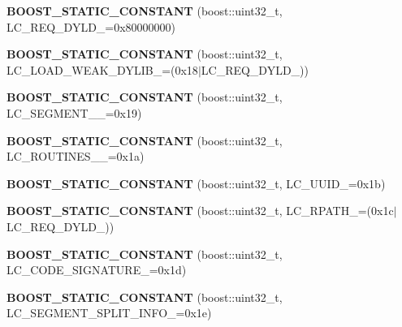 \begin{DoxyCompactItemize}
\mbox{\label{a01552_a38556d418f79efda908e855b2fada64e}} 
{\bfseries B\+O\+O\+S\+T\+\_\+\+S\+T\+A\+T\+I\+C\+\_\+\+C\+O\+N\+S\+T\+A\+NT} (boost\+::uint32\+\_\+t, L\+C\+\_\+\+R\+E\+Q\+\_\+\+D\+Y\+L\+D\+\_\+=0x80000000)
\item 
\mbox{\label{a01552_ac183a506054948c8bf2b0f62e5afbc2a}} 
{\bfseries B\+O\+O\+S\+T\+\_\+\+S\+T\+A\+T\+I\+C\+\_\+\+C\+O\+N\+S\+T\+A\+NT} (boost\+::uint32\+\_\+t, L\+C\+\_\+\+L\+O\+A\+D\+\_\+\+W\+E\+A\+K\+\_\+\+D\+Y\+L\+I\+B\+\_\+=(0x18$\vert$\+L\+C\+\_\+\+R\+E\+Q\+\_\+\+D\+Y\+L\+D\+\_\+))
\item 
\mbox{\label{a01552_a95224d2abc26fcd971f8abb80c68e822}} 
{\bfseries B\+O\+O\+S\+T\+\_\+\+S\+T\+A\+T\+I\+C\+\_\+\+C\+O\+N\+S\+T\+A\+NT} (boost\+::uint32\+\_\+t, L\+C\+\_\+\+S\+E\+G\+M\+E\+N\+T\+\_\+\_\+=0x19)
\item 
\mbox{\label{a01552_af3ee965b42b28daf4af3cf5d303fd465}} 
{\bfseries B\+O\+O\+S\+T\+\_\+\+S\+T\+A\+T\+I\+C\+\_\+\+C\+O\+N\+S\+T\+A\+NT} (boost\+::uint32\+\_\+t, L\+C\+\_\+\+R\+O\+U\+T\+I\+N\+E\+S\+\_\+\_\+=0x1a)
\item 
\mbox{\label{a01552_ab9a1ea56b4daa5742fb6ca86c0c1e0ba}} 
{\bfseries B\+O\+O\+S\+T\+\_\+\+S\+T\+A\+T\+I\+C\+\_\+\+C\+O\+N\+S\+T\+A\+NT} (boost\+::uint32\+\_\+t, L\+C\+\_\+\+U\+U\+I\+D\+\_\+=0x1b)
\item 
\mbox{\label{a01552_aa383ccae1c85ee5f2aed108bd84ba4d2}} 
{\bfseries B\+O\+O\+S\+T\+\_\+\+S\+T\+A\+T\+I\+C\+\_\+\+C\+O\+N\+S\+T\+A\+NT} (boost\+::uint32\+\_\+t, L\+C\+\_\+\+R\+P\+A\+T\+H\+\_\+=(0x1c$\vert$\+L\+C\+\_\+\+R\+E\+Q\+\_\+\+D\+Y\+L\+D\+\_\+))
\item 
\mbox{\label{a01552_af5641df120639f5faeeef336f8bb79be}} 
{\bfseries B\+O\+O\+S\+T\+\_\+\+S\+T\+A\+T\+I\+C\+\_\+\+C\+O\+N\+S\+T\+A\+NT} (boost\+::uint32\+\_\+t, L\+C\+\_\+\+C\+O\+D\+E\+\_\+\+S\+I\+G\+N\+A\+T\+U\+R\+E\+\_\+=0x1d)
\item 
\mbox{\label{a01552_a1d748241537cdf48cae6d7c2ad3dd46c}} 
{\bfseries B\+O\+O\+S\+T\+\_\+\+S\+T\+A\+T\+I\+C\+\_\+\+C\+O\+N\+S\+T\+A\+NT} (boost\+::uint32\+\_\+t, L\+C\+\_\+\+S\+E\+G\+M\+E\+N\+T\+\_\+\+S\+P\+L\+I\+T\+\_\+\+I\+N\+F\+O\+\_\+=0x1e)

\end{DoxyCompactItemize}
